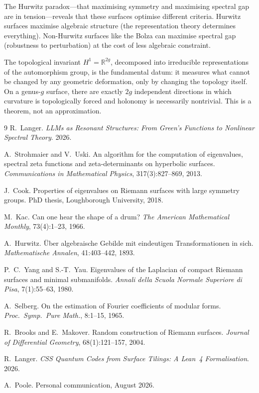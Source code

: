 \documentclass[11pt,a4paper]{article}
\begin{document}
\medskip
The Hurwitz paradox---that maximising symmetry and maximising spectral gap are
in tension---reveals that these surfaces optimise different criteria. Hurwitz
surfaces maximise algebraic structure (the representation theory determines
everything). Non-Hurwitz surfaces like the Bolza can maximise spectral gap
(robustness to perturbation) at the cost of less algebraic constraint.

The topological invariant $H^1 = \mathbb{R}^{2g}$, decomposed into irreducible
representations of the automorphism group, is the fundamental datum: it measures
what cannot be changed by any geometric deformation, only by changing the
topology itself. On a genus-$g$ surface, there are exactly $2g$ independent
directions in which curvature is topologically forced and holonomy is necessarily
nontrivial. This is a theorem, not an approximation.

\begin{thebibliography}{9}
R.~Langer.
\emph{LLMs as Resonant Structures: From Green's Functions to Nonlinear
Spectral Theory}. 2026.

A.~Strohmaier and V.~Uski.
An algorithm for the computation of eigenvalues, spectral zeta functions
and zeta-determinants on hyperbolic surfaces.
\emph{Communications in Mathematical Physics}, 317(3):827--869, 2013.

J.~Cook.
Properties of eigenvalues on Riemann surfaces with large symmetry groups.
PhD thesis, Loughborough University, 2018.

M.~Kac.
Can one hear the shape of a drum?
\emph{The American Mathematical Monthly}, 73(4):1--23, 1966.

A.~Hurwitz.
\"{U}ber algebraische Gebilde mit eindeutigen Transformationen in sich.
\emph{Mathematische Annalen}, 41:403--442, 1893.

P.~C.~Yang and S.-T.~Yau.
Eigenvalues of the Laplacian of compact Riemann surfaces and minimal submanifolds.
\emph{Annali della Scuola Normale Superiore di Pisa}, 7(1):55--63, 1980.

A.~Selberg.
On the estimation of Fourier coefficients of modular forms.
\emph{Proc.\ Symp.\ Pure Math.}, 8:1--15, 1965.

R.~Brooks and E.~Makover.
Random construction of Riemann surfaces.
\emph{Journal of Differential Geometry}, 68(1):121--157, 2004.

R.~Langer.
\emph{CSS Quantum Codes from Surface Tilings: A Lean~4 Formalisation}.
2026.

A.~Poole.
Personal communication, August 2026.
\end{thebibliography}
\end{document}
